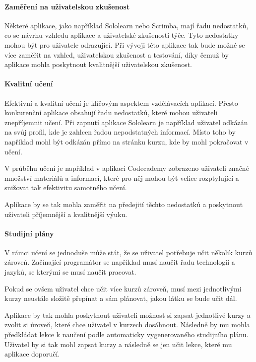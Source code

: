 \paragraph{Zaměření na uživatelskou zkušenost}

Některé aplikace, jako například Sololearn nebo Scrimba, mají řadu nedostatků, co se návrhu vzhledu aplikace a uživatelské zkušenosti týče. Tyto nedostatky mohou být pro uživatele odrazující. Při vývoji této aplikace tak bude možné se více zaměřit na vzhled, uživatelskou zkušenost a testování, díky čemuž by aplikace mohla poskytnout kvalitnější uživatelskou zkušenost.

\paragraph{Kvalitní učení}

Efektivní a kvalitní učení je klíčovým aspektem vzdělávacích aplikací. Přesto konkurenční aplikace obsahují řadu nedostatků, které mohou uživateli znepříjemnit učení. Při zapnutí aplikace Sololearn je například uživatel odkázán na svůj profil, kde je zahlcen řadou nepodstatných informací. Místo toho by například mohl být odkázán přímo na stránku kurzu, kde by mohl pokračovat v učení.

V průběhu učení je například v aplikaci Codecademy zobrazeno uživateli značné množství materiálů a informací, které pro něj mohou být velice rozptylující a snižovat tak efektivitu samotného učení.

Aplikace by se tak mohla zaměřit na předejití těchto nedostatků a poskytnout uživateli příjemnější a kvalitnější výuku.

\paragraph{Studijní plány}

V rámci učení se jednoduše může stát, že se uživatel potřebuje učit několik kurzů zároveň. Začínající programátor se například musí naučit řadu technologií a jazyků, se kterými se musí naučit pracovat. 

Pokud se ovšem uživatel chce učit více kurzů zároveň, musí mezi jednotlivými kurzy neustále složitě přepínat a sám plánovat, jakou látku se bude učit dál.

Aplikace by tak mohla poskytnout uživateli možnost si zapsat jednotlivé kurzy a zvolit si úroveň, které chce uživatel v kurzech dosáhnout. Následně by mu mohla předkládat lekce k naučení podle automaticky vygenerovaného studijního plánu. Uživatel by si tak mohl zapsat kurzy a následně se jen učit lekce, které mu aplikace doporučí.

